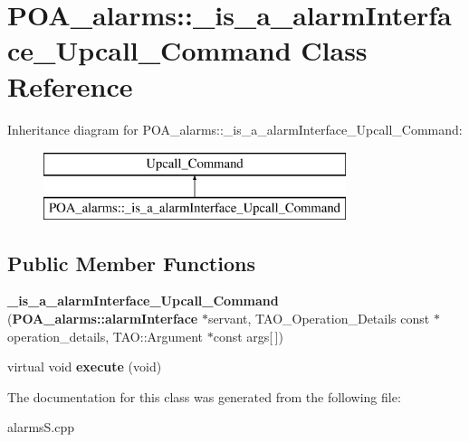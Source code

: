 \section{P\+O\+A\+\_\+alarms\+:\+:\+\_\+is\+\_\+a\+\_\+alarm\+Interface\+\_\+\+Upcall\+\_\+\+Command Class Reference}
\label{classPOA__alarms_1_1__is__a__alarmInterface__Upcall__Command}
Inheritance diagram for P\+O\+A\+\_\+alarms\+:\+:\+\_\+is\+\_\+a\+\_\+alarm\+Interface\+\_\+\+Upcall\+\_\+\+Command\+:\begin{figure}[H]
\begin{center}
\leavevmode
\includegraphics[height=2.000000cm]{classPOA__alarms_1_1__is__a__alarmInterface__Upcall__Command}
\end{center}
\end{figure}
\subsection*{Public Member Functions}
\begin{DoxyCompactItemize}
\item 
{\bfseries \+\_\+is\+\_\+a\+\_\+alarm\+Interface\+\_\+\+Upcall\+\_\+\+Command} ({\bf P\+O\+A\+\_\+alarms\+::alarm\+Interface} $\ast$servant, T\+A\+O\+\_\+\+Operation\+\_\+\+Details const $\ast$operation\+\_\+details, T\+A\+O\+::\+Argument $\ast$const args[$\,$])\label{classPOA__alarms_1_1__is__a__alarmInterface__Upcall__Command_a7c771eb25fc4d71a43f50e5a4681badf}

\item 
virtual void {\bfseries execute} (void)\label{classPOA__alarms_1_1__is__a__alarmInterface__Upcall__Command_a800bd0c500556fbad6a654eeaccdd987}

\end{DoxyCompactItemize}


The documentation for this class was generated from the following file\+:\begin{DoxyCompactItemize}
\item 
alarms\+S.\+cpp\end{DoxyCompactItemize}
